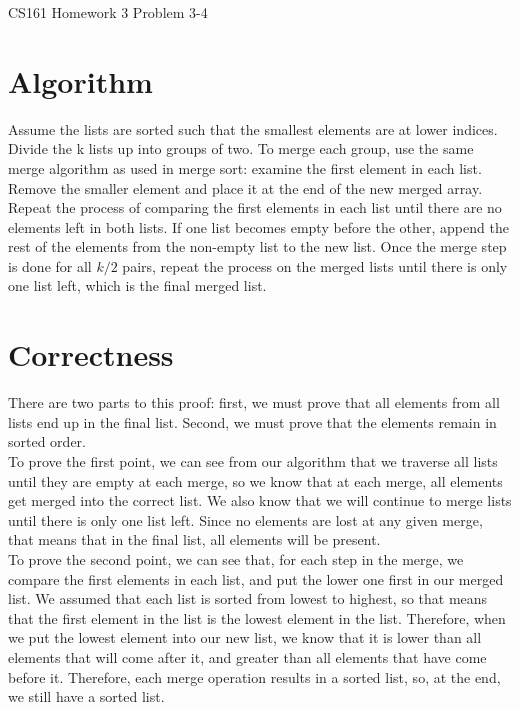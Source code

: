 \documentclass[12pt]{article}
\begin{document}
\begin{center}
{\Large CS161 Homework 3 Problem 3-4}

\end{center}

\section*{Algorithm}
Assume the lists are sorted such that the smallest elements are at lower indices. Divide the k lists up into groups of two. To merge each group, use the same merge algorithm as used in merge sort: examine the first element in each list. Remove the smaller element and place it at the end of the new merged array. Repeat the process of comparing the first elements in each list until there are no elements left in both lists. If one list becomes empty before the other, append the rest of the elements from the non-empty list to the new list. Once the merge step is done for all $k/2$ pairs, repeat the process on the merged lists until there is only one list left, which is the final merged list.

\section*{Correctness}
There are two parts to this proof: first, we must prove that all elements from all lists end up in the final list. Second, we must prove that the elements remain in sorted order. \\
To prove the first point, we can see from our algorithm that we traverse all lists until they are empty at each merge, so we know that at each merge, all elements get merged into the correct list. We also know that we will continue to merge lists until there is only one list left. Since no elements are lost at any given merge, that means that in the final list, all elements will be present.\\
To prove the second point, we can see that, for each step in the merge, we compare the first elements in each list, and put the lower one first in our merged list. We assumed that each list is sorted from lowest to highest, so that means that the first element in the list is the lowest element in the list. Therefore, when we put the lowest element into our new list, we know that it is lower than all elements that will come after it, and greater than all elements that have come before it. Therefore, each merge operation results in a sorted list, so, at the end, we still have a sorted list.
\end{document}

